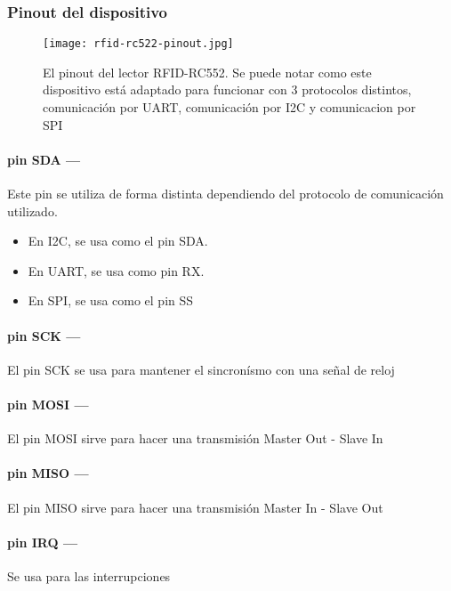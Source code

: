 \documentclass[../informe_krapp.tex]{subfiles}
\begin{document}
\clearpage
\subsubsection{Pinout del dispositivo}

\begin{wrapfigure}{r}{0in}
	\centering
	\texttt{[image: rfid-rc522-pinout.jpg]}
	\caption{El pinout del lector RFID-RC552.
		Se puede notar como este dispositivo está adaptado para funcionar con 3 protocolos
		distintos, comunicación por UART, comunicación por I2C y comunicacion por SPI}
\end{wrapfigure}


\paragraph{pin SDA ---}
Este pin se utiliza de forma distinta dependiendo del protocolo
de comunicación utilizado.
\begin{itemize}
	\item En I2C, se usa como el pin SDA.
	\item En UART, se usa como pin RX.
	\item En SPI, se usa como el pin SS
\end{itemize}

\paragraph{pin SCK ---}
El pin SCK se usa para mantener el sincronísmo con una señal de reloj

\paragraph{pin MOSI ---}
El pin MOSI sirve para hacer una transmisión Master Out - Slave In

\paragraph{pin MISO ---}
El pin MISO sirve para hacer una transmisión Master In - Slave Out

\paragraph{pin IRQ ---}
Se usa para las interrupciones
\end{document}
